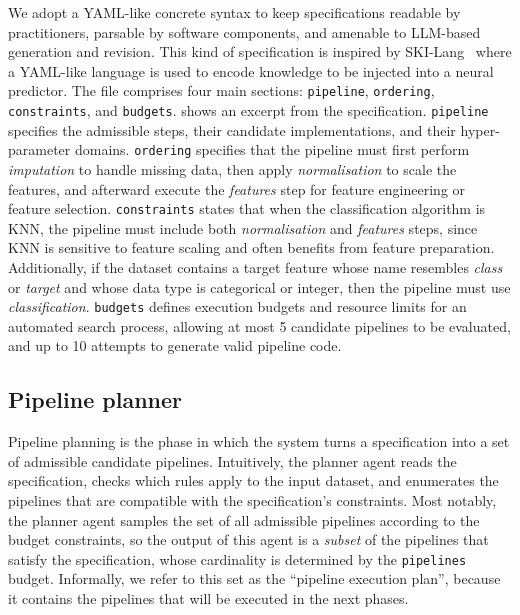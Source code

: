 \documentclass[runningheads]{llncs}
\begin{document}
We adopt a YAML-like concrete syntax to keep specifications readable by practitioners,
parsable by software components,
and
amenable to \ac{LLM}-based generation and revision.
%
This kind of specification is inspired by SKI-Lang~\cite{skilang}
where a YAML-like language is used to encode knowledge to be injected into a neural predictor.
%
The file comprises four main sections:
\texttt{pipeline},
\texttt{ordering},
\texttt{constraints},
and
\texttt{budgets}.
 shows an excerpt from the specification.
\texttt{pipeline} specifies the admissible steps, their candidate implementations, and their hyper-parameter domains.
\texttt{ordering} specifies that the pipeline must first perform \textit{imputation} to handle missing data, then apply \textit{normalisation} to scale the features, and afterward execute the \textit{features} step for feature engineering or feature selection.
\texttt{constraints} states that when the classification algorithm is KNN, the pipeline must include both \textit{normalisation} and \textit{features} steps, since KNN is sensitive to feature scaling and often benefits from feature preparation.
Additionally, if the dataset contains a target feature whose name resembles \textit{class} or \textit{target} and whose data type is categorical or integer, then the pipeline must use \textit{classification}.
\texttt{budgets} defines execution budgets and resource limits for an automated search process, allowing at most 5 candidate pipelines to be evaluated, and up to 10 attempts to generate valid pipeline code.


\subsection{Pipeline planner}
\label{subsec:pipeline-planning}

Pipeline planning is the phase in which the system turns a specification into a set of admissible candidate pipelines.
%
Intuitively,
the planner agent reads the specification,
checks which rules apply to the input dataset,
and enumerates the pipelines that are compatible with the specification's constraints.
%
Most notably,
the planner agent samples the set of all admissible pipelines according to the budget constraints,
so the output of this agent is a \emph{subset} of the pipelines that satisfy the specification,
whose cardinality is determined by the \texttt{pipelines} budget.
%
Informally,
we refer to this set as the ``pipeline execution plan'',
because it contains the pipelines that will be executed in the next phases.
\end{document}
